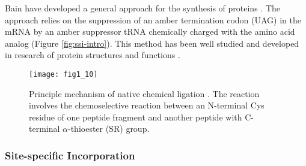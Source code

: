 \begin{refsection}
Bain  have developed a general
approach for the  synthesis of proteins \cite{Bain1991}.  The
approach relies on the suppression of an amber termination codon (UAG) in the
mRNA by an amber suppressor tRNA chemically charged with the amino acid analog
\cite{Theato2013} (Figure \ref{fig:ssi-intro}).  This method has been well
studied and developed in research of protein structures and functions
\cite{Martoglio1995,Eichler1997}.
\begin{figure}[h!] \centering \texttt{[image: fig1\_10]}
    \caption[Princilple mechanism of native chemical ligation. The reaction
    involves the chemoselective reaction between an N-terminal Cys residue of
one peptide fragment and another peptide with C-terminal $\alpha$-thioester
(SR) group.]{Principle mechanism of native chemical ligation \cite{Theato2013}.
The reaction involves the chemoselective reaction between an N-terminal Cys
residue of one peptide fragment and another peptide with C-terminal
$\alpha$-thioester (SR) group.} 
\label{fig:ncl-intro} 
\end{figure}

\subsubsection{ Site-specific Incorporation}


\end{refsection}
